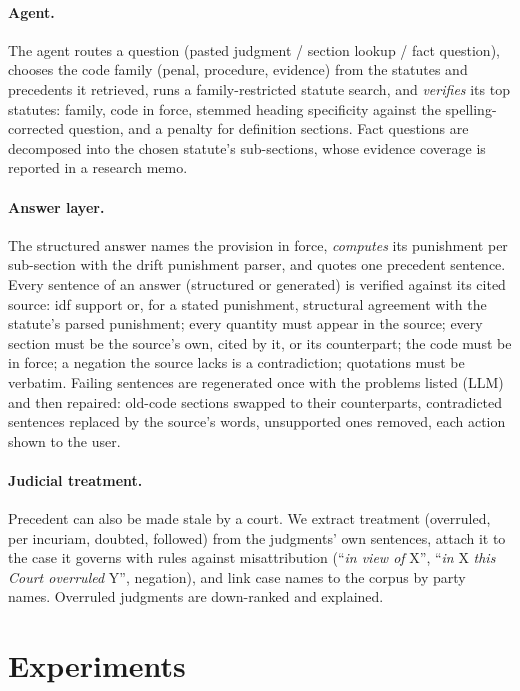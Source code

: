 \documentclass[11pt]{article}
\begin{document}
\paragraph{Agent.} The agent routes a question (pasted judgment / section lookup / fact question),
chooses the code family (penal, procedure, evidence) from the statutes and precedents it
retrieved, runs a family-restricted statute search, and \emph{verifies} its top statutes: family,
code in force, stemmed heading specificity against the spelling-corrected question, and a penalty
for definition sections. Fact questions are decomposed into the chosen statute's sub-sections,
whose evidence coverage is reported in a research memo.
\paragraph{Answer layer.} The structured answer names the provision in force, \emph{computes} its
punishment per sub-section with the drift punishment parser, and quotes one precedent sentence.
Every sentence of an answer (structured or generated) is verified against its cited source: idf
support or, for a stated punishment, structural agreement with the statute's parsed punishment;
every quantity must appear in the source; every section must be the source's own, cited by it, or
its counterpart; the code must be in force; a negation the source lacks is a contradiction;
quotations must be verbatim. Failing sentences are regenerated once with the problems listed (LLM)
and then repaired: old-code sections swapped to their counterparts, contradicted sentences replaced
by the source's words, unsupported ones removed, each action shown to the user.
\paragraph{Judicial treatment.} Precedent can also be made stale by a court. We extract
treatment (overruled, per incuriam, doubted, followed) from the judgments' own sentences,
attach it to the case it governs with rules against misattribution (``\emph{in view of} X'',
``\emph{in} X \emph{this Court overruled} Y'', negation), and link case names to the corpus by
party names. Overruled judgments are down-ranked and explained.

\section{Experiments}\label{sec:results}
\end{document}
